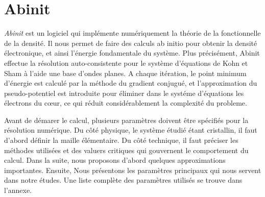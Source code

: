 \section{Abinit}
\label{sec-abinit}
\textit{Abinit} est un logiciel qui implémente numériquement la théorie de la fonctionnelle de la densité.
Il nous permet de faire des calculs ab initio pour obtenir la densité électronique,
et ainsi l'énergie fondamentale du système.
Plus précisément, Abinit effectue la résolution auto-consistente pour le système d'équations de Kohn et Sham à l'aide une base d'ondes planes.
A chaque itération, le point minimum d'énergie est calculé par la méthode du gradient conjugué,
et l'approximation du pseudo-potentiel est introduite pour éliminer dans le systéme d'équations les électrons du cœur,
ce qui réduit considérablement la complexité du probleme.

Avant de démarer le calcul,
plusieurs paramètres doivent être spécifiés pour la résolution numérique.
Du côté physique, le système étudié étant cristallin,
il faut d'abord définir la maille élémentaire.
Du côté technique, il faut préciser les méthodes utilisées et des valuers critiques qui gouvernent le comportement du calcul.
Dans la suite, nous proposons d'abord quelques approximations importantes. Ensuite,
Nous présentons les paramètres principaux qui nous servent dans notre études.
Une liste complète des paramètres utilisés se trouve dans l'annexe.

